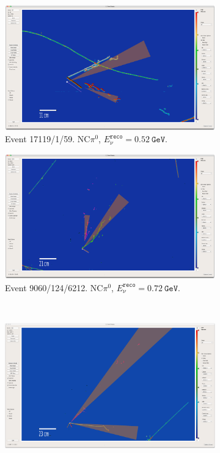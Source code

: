 \begin{figure}[H]
    \begin{center}
    \begin{subfigure}{0.45\textwidth}
    \includegraphics[width=1.00\textwidth]{Sidebands/Figures/1eNp/TwoShower/EVD/evt-17119-1-59_reco2.png}
    \caption{Event 17119/1/59. NC$\pi^0$, $E_\nu^{\texttt{reco}} = 0.52~\texttt{GeV}$.}
    \end{subfigure}
    \begin{subfigure}{0.45\textwidth}
    \includegraphics[width=1.00\textwidth]{Sidebands/Figures/1eNp/TwoShower/EVD/evt-9060-124-6212_reco2.png}
    \caption{Event 9060/124/6212. NC$\pi^0$, $E_\nu^{\texttt{reco}} = 0.72~\texttt{GeV}$.}
    \end{subfigure} \\
    \vspace{0.3cm}
    \begin{subfigure}{0.45\textwidth}
    \includegraphics[width=1.00\textwidth]{Sidebands/Figures/1eNp/TwoShower/EVD/evt-14073-207-10357_reco1.png}

\end{subfigure}
\end{center}
\end{figure}
